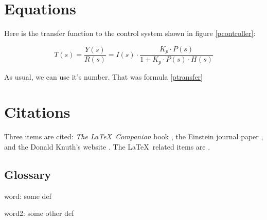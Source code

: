 \documentclass[12pt]{article}
\begin{document}
	\section{Equations}

	Here is the transfer function to the control system shown in figure \ref{pcontroller}:

	\begin{equation}
	\label{ptransfer}
	T(s)=\frac{Y(s)}{R(s)}=I(s) \cdot \frac{K_p \cdot P(s)}{1 + K_p \cdot P(s) \cdot H(s)}
	\end{equation}

	As usual, we can use it's number. That was formula \eqref{ptransfer}

	\section{Citations}

	Three items are cited: \textit{The \LaTeX\ Companion} book \cite{latexcompanion}, the Einstein journal paper \cite{einstein}, and the Donald Knuth's website \cite{knuthwebsite}. The \LaTeX\ related items are \cite{latexcompanion,knuthwebsite}.

	\newpage
	\startappendixtitles
	\begin{appendices}

	\section{Glossary}
	\stopindent
	word: some def

	word2: some other def

	\startindent
	\end{appendices}
	\finishappendixtitles

	\makesydebib
\end{document}
